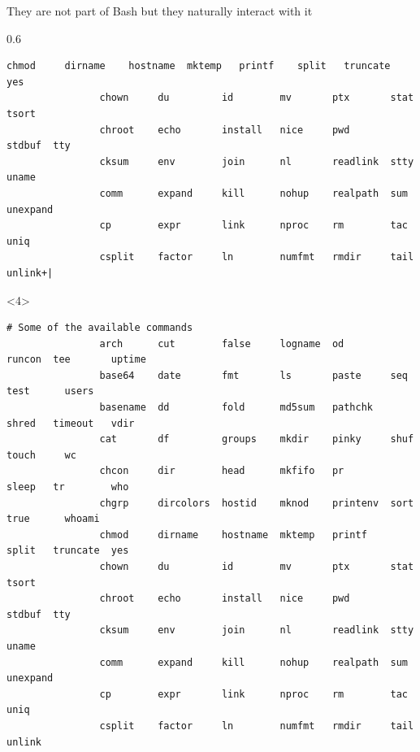 \begin{frame}[fragile]{They are not part of Bash but they naturally interact with it}
\begin{overlayarea}{\textwidth}{0.6\textheight}
\begin{onlyenv}
\begin{lstlisting}[style=myBash, style=smaller, numbers=none, aboveskip=3mm]
                chmod     dirname    hostname  mktemp   printf    split   truncate  yes
                chown     du         id        mv       ptx       stat    tsort
                chroot    echo       install   nice     pwd       stdbuf  tty
                cksum     env        join      nl       readlink  stty    uname
                comm      expand     kill      nohup    realpath  sum     unexpand
                cp        expr       link      nproc    rm        tac     uniq
                csplit    factor     ln        numfmt   rmdir     tail    unlink+|
            \end{lstlisting}
        \end{onlyenv}
        \begin{onlyenv}<4>
            \begin{lstlisting}[style=myBash, style=smaller, numbers=none, aboveskip=3mm, belowskip=-8mm, deletekeywords={expr, nice, nohup}]
                # Some of the available commands
                arch      cut        false     logname  od        runcon  tee       uptime
                base64    date       fmt       ls       paste     seq     test      users
                basename  dd         fold      md5sum   pathchk   shred   timeout   vdir
                cat       df         groups    mkdir    pinky     shuf    touch     wc
                chcon     dir        head      mkfifo   pr        sleep   tr        who
                chgrp     dircolors  hostid    mknod    printenv  sort    true      whoami
                chmod     dirname    hostname  mktemp   printf    split   truncate  yes
                chown     du         id        mv       ptx       stat    tsort
                chroot    echo       install   nice     pwd       stdbuf  tty
                cksum     env        join      nl       readlink  stty    uname
                comm      expand     kill      nohup    realpath  sum     unexpand
                cp        expr       link      nproc    rm        tac     uniq
                csplit    factor     ln        numfmt   rmdir     tail    unlink
            \end{lstlisting}
        \end{onlyenv}
    \end{overlayarea}
\end{frame}
